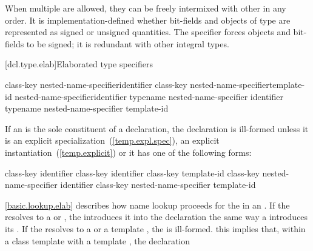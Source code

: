 When multiple  are allowed, they can be
freely intermixed with other  in any order.
It is implementation-defined whether bit-fields and objects of 
type are represented as signed or
unsigned quantities. The  specifier forces 
objects and bit-fields to be signed; it is redundant with other integral types.

[dcl.type.elab]{Elaborated type specifiers}%
%
%

\begin{bnf}
\br
    class-key \terminal{::}\opt nested-name-specifier\opt identifier\br
    class-key \terminal{::}\opt nested-name-specifier\opt {}\opt template-id\br
     \terminal{::}\opt nested-name-specifier\opt identifier\br
    typename \terminal{::}\opt nested-name-specifier identifier\br
    typename \terminal{::}\opt nested-name-specifier \opt template-id
\end{bnf}

\pnum
{}%
%
If an  is the sole constituent of a
declaration, the declaration is ill-formed unless it is an explicit
specialization~(\ref{temp.expl.spec}), an explicit
instantiation~(\ref{temp.explicit}) or it has one of the following
forms:

\begin{ncsimplebnf}
class-key identifier \terminal{;}\br
{} class-key \terminal{::\opt} identifier \terminal{;}\br
{} class-key \terminal{::\opt} template-id \terminal{;}\br
{} class-key \terminal{::\opt} nested-name-specifier identifier \terminal{;}\br
{} class-key \terminal{::\opt} nested-name-specifier  template-id \terminal{;}
\end{ncsimplebnf}

\pnum
\ref{basic.lookup.elab} describes how name lookup proceeds for the
 in an . If the
 resolves to a  or
, the 
introduces it into the declaration the same way a
 introduces its . If
the  resolves to a
 or a template ,
the  is ill-formed.
\enternote
this implies that, within a class template with a template
 , the declaration

